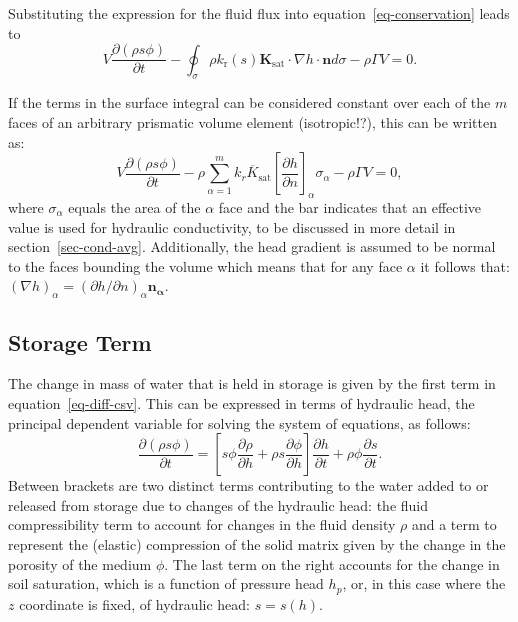 \documentclass[fleqn]{article}
\begin{document}
Substituting the expression for the fluid flux into equation~\ref{eq-conservation}
leads to
\begin{equation}
  V \frac{\partial (\rho s \phi)}{\partial t} -
  \oint_\sigma \rho k_\text{r}(s) \mathbf{K}_{\textrm{sat}}
  \cdot \nabla h \cdot \mathbf{n} d\sigma -
  \rho \Gamma V = 0.
\end{equation}

If the terms in the surface integral can be considered constant over each of the 
$m$ faces of an arbitrary prismatic volume element (isotropic!?), 
this can be written as:
\begin{equation}
  V \frac{\partial (\rho s \phi)}{\partial t} -
  \rho \sum_{\alpha=1}^{m} \overline{k_r K_{\textrm{sat}}}
  \left[\frac{\partial h}{\partial n}\right]_\alpha \sigma_\alpha -
  \rho \Gamma V = 0,
  \label{eq-diff-csv}
\end{equation}
where $\sigma_\alpha$ equals the area of the $\alpha$ face and the bar indicates 
that an effective value is used for hydraulic conductivity, to be discussed 
in more detail in section~\ref{sec-cond-avg}. Additionally, the head 
gradient is assumed to be normal to the faces bounding the volume which
means that for any face $\alpha$ it follows that:
$(\nabla h)_\alpha = (\partial h/\partial n)_\alpha \mathbf{n_\alpha}$.

\subsection{Storage Term}
The change in mass of water that is held in storage is given by the first 
term in equation~\ref{eq-diff-csv}. This can be expressed in terms of hydraulic
head, the principal dependent variable for solving the system of equations,
as follows:
\begin{equation}
  \frac{\partial (\rho s \phi)}{\partial t} =
  \left[
    s \phi \frac{\partial \rho}{\partial h} +
    \rho s \frac{\partial \phi}{\partial h}
    \right]
  \frac{\partial h}{\partial t} +  
  \rho \phi \frac{\partial s}{\partial t}.
  \label{eq-sto-terms}
\end{equation}
Between brackets are two distinct terms contributing to the water
added to or released from storage due to changes of the hydraulic
head: the fluid compressibility term to account for changes in the
fluid density $\rho$ and a term to represent the (elastic)
compression of the solid matrix given by the change in the porosity
of the medium $\phi$. The last term on the right accounts for the
change in soil saturation, which is a function of pressure head $h_p$, 
or, in this case where the $z$ coordinate is fixed, of hydraulic 
head: $s = s(h)$.
\end{document}
